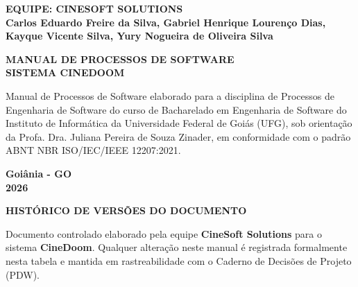 \documentclass[12pt,a4paper]{article}
\begin{document}
\begin{titlepage}
  \centering
  \textbf{EQUIPE: CINESOFT SOLUTIONS}\\
  \vspace{0.4cm}
  \textbf{Carlos Eduardo Freire da Silva, Gabriel Henrique Lourenço Dias,}\\
  \textbf{Kayque Vicente Silva, Yury Nogueira de Oliveira Silva}\\
  \vspace{3.8cm}
  
  \MakeUppercase{\textbf{Manual de Processos de Software}}\\
  \MakeUppercase{\textbf{Sistema CineDoom}}\\
  \vspace{2.2cm}
  
  \hfill
  \begin{minipage}{0.52\textwidth}
    \begin{singlespace}
      \small
      Manual de Processos de Software elaborado para a disciplina de Processos de Engenharia de Software do curso de Bacharelado em Engenharia de Software do Instituto de Informática da Universidade Federal de Goiás (UFG), sob orientação da Profa. Dra. Juliana Pereira de Souza Zinader, em conformidade com o padrão ABNT NBR ISO/IEC/IEEE 12207:2021.
    \end{singlespace}
  \end{minipage}
  \vfill
  
  \textbf{Goiânia - GO}\\
  \textbf{2026}
\end{titlepage}

\newpage
\thispagestyle{empty}
\begin{center}
  \MakeUppercase{\textbf{Histórico de Versões do Documento}}
\end{center}
\vspace{0.8cm}

\noindent Documento controlado elaborado pela equipe \textbf{CineSoft Solutions} para o sistema \textbf{CineDoom}. Qualquer alteração neste manual é registrada formalmente nesta tabela e mantida em rastreabilidade com o Caderno de Decisões de Projeto (PDW).
\end{document}
